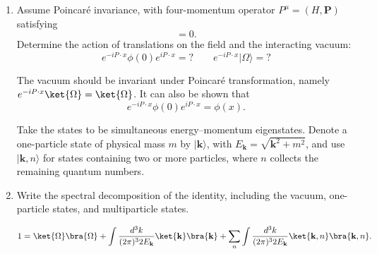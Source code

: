 \begin{enumerate}[label=\alph*)]
    \item Assume Poincar\'e invariance, with four-momentum operator
    $P^\mu=(H,\mathbf P)$ satisfying
    \begin{equation}
        [P^\mu,P^\nu]=0.
    \end{equation}
    Determine the action of translations on the field and the interacting vacuum:
    \begin{equation}
        e^{-iP\cdot x}\phi(0)e^{iP\cdot x}=?
        \qquad
        e^{-iP\cdot x}|\Omega\rangle=?
    \end{equation}
    \begin{solution}
    The vacuum should be invariant under Poincaré transformation, namely $e^{-iP\cdot x}\ket{\Omega} = \ket{\Omega}$. It can also be shown that
    \begin{equation}
        e^{-iP\cdot x}\phi(0)e^{iP\cdot x}= \phi(x).
    \end{equation}
    \end{solution}
    Take the states to be simultaneous energy--momentum eigenstates. Denote a
    one-particle state of physical mass $m$ by $|\mathbf k\rangle$, with
    $E_{\mathbf k}=\sqrt{\mathbf k^2+m^2}$, and use
    $|\mathbf k,n\rangle$ for states containing two or more particles, where
    $n$ collects the remaining quantum numbers.

    \item Write the spectral decomposition of the identity, including the vacuum,
    one-particle states, and multiparticle states.
    \begin{solution}
        \begin{equation}
            1 = \ket{\Omega}\bra{\Omega} + \int\frac{d^3k}{(2\pi)^32E_\mathbf{k}}\ket{\mathbf{k}}\bra{\mathbf{k}} + \sum_n\int\frac{d^3k}{(2\pi)^32E_\mathbf{k}}\ket{\mathbf{k},n}\bra{\mathbf{k},n}.
        \end{equation}
    \end{solution}


\end{enumerate}
